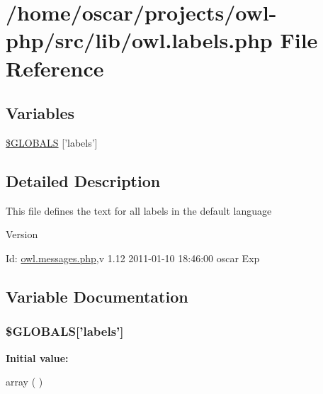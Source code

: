 \section{/home/oscar/projects/owl-\/php/src/lib/owl.labels.php File Reference}
\label{owl_8labels_8php}
\subsection*{Variables}
\begin{DoxyCompactItemize}
\item 
\hyperlink{owl_8labels_8php_a49e8feb96fae9cb6655df44ebad3ca2b}{\$GLOBALS} \mbox{[}'labels'\mbox{]}
\end{DoxyCompactItemize}


\subsection{Detailed Description}
This file defines the text for all labels in the default language \begin{DoxyVersion}{Version}

\end{DoxyVersion}
\begin{DoxyParagraph}{Id:}
\hyperlink{owl_8messages_8php}{owl.messages.php},v 1.12 2011-\/01-\/10 18:46:00 oscar Exp 
\end{DoxyParagraph}


\subsection{Variable Documentation}
\subsubsection[{\$GLOBALS}]{\setlength{\rightskip}{0pt plus 5cm}\$GLOBALS\mbox{[}'labels'\mbox{]}}\label{owl_8labels_8php_a49e8feb96fae9cb6655df44ebad3ca2b}
{\bfseries Initial value:}
\begin{DoxyCode}
 array (
)
\end{DoxyCode}
